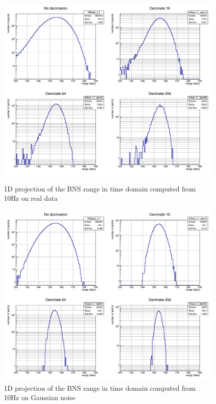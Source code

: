 \begin{figure}
  \centering
  \begin{minipage}{\linewidth}
    \centering
    \includegraphics[width=0.7\linewidth]{sectionBadTriggers/PSD/Range/range_PSD/c1DReal_L1.png}
    \caption{1D projection of the BNS range in time domain computed from 10Hz on real data}
    \label{fig:rangeReal_BNS_10_1D}
  \end{minipage}
  \hfill
  \vspace{0.4cm}
  \begin{minipage}{\linewidth}
    \centering
    \includegraphics[width=0.7\linewidth]{sectionBadTriggers/PSD/Range/range_PSD/c1DGaus_L1.png}
    \caption{1D projection of the BNS range in time domain computed from 10Hz on Gaussian noise}
    \label{fig:rangeGaus_BNS_10_1D}
  \end{minipage}
\end{figure}

